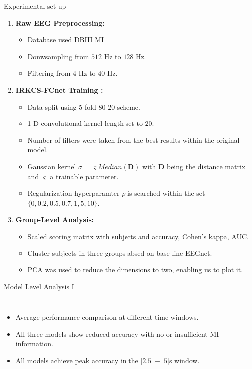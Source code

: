 \documentclass[aspectratio=169]{beamer}
\let\oldcite\cite %
\renewcommand{\cite}[1]{{\tiny\oldcite{#1}}}
\newcommand{\mat}[1]{\bm {#1}}
\begin{document}
\begin{frame}{Experimental set-up}
    \begin{enumerate}
        \item \textbf{Raw EEG Preprocessing:} 
        \begin{itemize}
            \item Database used DBIII MI
            \item Donwsampling from $512$ Hz to $128$ Hz. 
            \item Filtering from $4$ Hz to $40$ Hz.
        \end{itemize}
        \item \textbf{IRKCS-FCnet Training \cite{lawhern2018eegnet, schirrmeister2017deep}:}
        \begin{itemize}
            \item Data split using 5-fold 80-20 scheme.
            \item 1-D convolutional kernel length set to $20$.
            \item Number of filters were taken from the best results within the original model.
            \item Gaussian kernel $\sigma=\varsigma  Median( \mat{D} ) $ with $\mat{D}$ being the distance matrix and $\varsigma$ a trainable parameter. 
            \item Regularization hyperparamter $\rho$ is searched within the set $\{0,0.2,0.5,0.7,1,5,10\}$.
        \end{itemize}
        \item \textbf{Group-Level Analysis:}
        \begin{itemize}
            \item Scaled scoring matrix with subjects and accuracy, Cohen's kappa, AUC.
            \item Cluster subjects in three groups absed on base line EEGnet.
            \item PCA was used to reduce the dimensions to two, enabling us to plot it.
        \end{itemize}
    \end{enumerate}
\end{frame}


\begin{frame}{Model Level Analysis I} 
    \begin{columns}
            \centering
            \resizebox{0.9\linewidth}{!}{}
            \begin{itemize} 
                \item Average performance comparison at different time windows.
                \item All three models show reduced accuracy with no or insufficient MI information.
                \item All models achieve peak accuracy in the [$2.5$~−~$5$]s window.
            \end{itemize}
    \end{columns}        
\end{frame}
\end{document}

